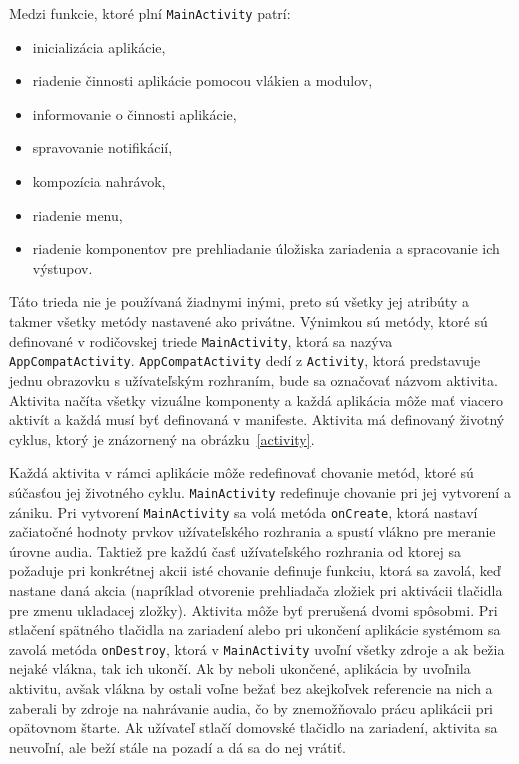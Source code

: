 Medzi funkcie, ktoré plní \texttt{MainActivity} patrí:
\begin{itemize}
 \item{inicializácia aplikácie,}
 \item{riadenie činnosti aplikácie pomocou vlákien a modulov,}
 \item{informovanie o činnosti aplikácie,}
 \item{spravovanie notifikácií,}
 \item{kompozícia nahrávok,}
 \item{riadenie menu,}
 \item{riadenie komponentov pre prehliadanie úložiska zariadenia a spracovanie ich výstupov.}
\end{itemize}

Táto trieda nie je používaná žiadnymi inými, preto sú všetky jej atribúty a takmer všetky metódy nastavené ako privátne. Výnimkou sú metódy, ktoré sú definované v rodičovskej triede \texttt{MainActivity}, ktorá sa nazýva \texttt{AppCompatActivity}. \texttt{AppCompatActivity} dedí z \texttt{Activity}, ktorá predstavuje jednu obrazovku s užívateľským rozhraním, bude sa označovať názvom aktivita. Aktivita načíta všetky vizuálne komponenty a každá aplikácia môže mať viacero aktivít a každá musí byť definovaná v manifeste. Aktivita má definovaný životný cyklus, ktorý je znázornený na obrázku~\ref{activity}.


Každá aktivita v rámci aplikácie môže redefinovať chovanie metód, ktoré sú súčasťou jej životného cyklu. \texttt{MainActivity} redefinuje chovanie pri jej vytvorení a zániku. Pri vytvorení \texttt{MainActivity} sa volá metóda \texttt{onCreate}, ktorá nastaví začiatočné hodnoty prvkov užívateľského rozhrania a spustí vlákno pre meranie úrovne audia. Taktiež pre každú časť užívateľského rozhrania od ktorej sa požaduje pri konkrétnej akcii isté chovanie definuje funkciu, ktorá sa zavolá, keď nastane daná akcia (napríklad otvorenie prehliadača zložiek pri aktivácii tlačidla pre zmenu ukladacej zložky). Aktivita môže byť prerušená dvomi spôsobmi. Pri stlačení spätného tlačidla na zariadení alebo pri ukončení aplikácie systémom sa zavolá metóda \texttt{onDestroy}, ktorá v \texttt{MainActivity} uvoľní všetky zdroje a ak bežia nejaké vlákna, tak ich ukončí. Ak by neboli ukončené, aplikácia by uvoľnila aktivitu, avšak vlákna by ostali voľne bežať bez akejkoľvek referencie na nich a zaberali by zdroje na nahrávanie audia, čo by znemožňovalo prácu aplikácii pri opätovnom štarte. Ak užívateľ stlačí domovské tlačidlo na zariadení, aktivita sa neuvoľní, ale beží stále na pozadí a dá sa do nej vrátiť.

